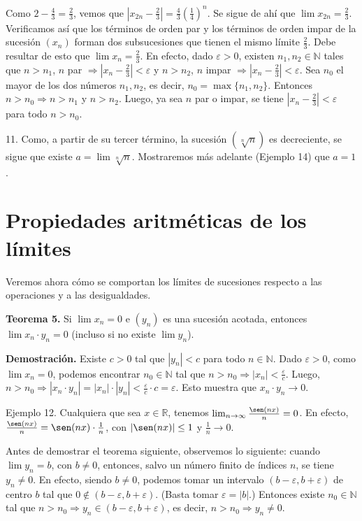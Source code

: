 \documentclass[12pt,oneside]{book}
\begin{document}
Como \(2 - \frac{4}{3} = \frac{2}{3}\), vemos que \(\left|x_{2n} - \frac{2}{3}\right| = \frac{4}{3} \left( \frac{1}{4} \right)^n\). Se sigue de ahí que \(\lim x_{2n} = \frac{2}{3}\). Verificamos así que los términos de orden par y los términos de orden impar de la sucesión \((x_n)\) forman dos subsucesiones que tienen el mismo límite \(\frac{2}{3}\). Debe resultar de esto que \(\lim x_n = \frac{2}{3}\). En efecto, dado \(\varepsilon > 0\), existen \(n_1, n_2 \in \mathbb{N}\) tales que \(n > n_1\), \(n\) par \(\Rightarrow \left|x_n - \frac{2}{3}\right| < \varepsilon\) y \(n > n_2\), \(n\) impar \(\Rightarrow \left|x_n - \frac{2}{3}\right| < \varepsilon\). Sea \(n_0\) el mayor de los dos números \(n_1, n_2\), es decir, \(n_0 = \max\{n_1, n_2\}\). Entonces \(n > n_0 \Rightarrow n > n_1\) y \(n > n_2\). Luego, ya sea \(n\) par o impar, se tiene \(\left|x_n - \frac{2}{3}\right| < \varepsilon\) para todo \(n > n_0\).

11. Como, a partir de su tercer término, la sucesión \((\sqrt[n]{n})\) es decreciente, se sigue que existe \(a = \lim \sqrt[n]{n}\). Mostraremos más adelante (Ejemplo 14) que \(a = 1\).

\section{Propiedades aritméticas de los límites}

Veremos ahora cómo se comportan los límites de sucesiones respecto a las operaciones y a las desigualdades.

\textbf{Teorema 5.} Si \(\lim x_n = 0\) e \((y_n)\) es una sucesión acotada, entonces \(\lim x_n \cdot y_n = 0\) (incluso si no existe \(\lim y_n\)).

\textbf{Demostración.} Existe \(c > 0\) tal que \(|y_n| < c\) para todo \(n \in \mathbb{N}\). Dado \(\varepsilon > 0\), como \(\lim x_n = 0\), podemos encontrar \(n_0 \in \mathbb{N}\) tal que \(n > n_0 \Rightarrow |x_n| < \frac{\varepsilon}{c}\). Luego, \(n > n_0 \Rightarrow |x_n \cdot y_n| = |x_n| \cdot |y_n| < \frac{\varepsilon}{c} \cdot c = \varepsilon\). Esto muestra que \(x_n \cdot y_n \to 0\).

Ejemplo 12. Cualquiera que sea \(x \in \mathbb{R}\), tenemos \(\lim_{n \to \infty} \frac{\sen(nx)}{n} = 0\). En efecto, \(\frac{\sen(nx)}{n} = \sen(nx) \cdot \frac{1}{n}\), con \(|\sen(nx)| \leq 1\) y \(\frac{1}{n} \to 0\).

Antes de demostrar el teorema siguiente, observemos lo siguiente: cuando \(\lim y_n = b\), con \(b \neq 0\), entonces, salvo un número finito de índices \(n\), se tiene \(y_n \neq 0\). En efecto, siendo \(b \neq 0\), podemos tomar un intervalo \((b - \varepsilon, b + \varepsilon)\) de centro \(b\) tal que \(0 \notin (b - \varepsilon, b + \varepsilon)\). (Basta tomar \(\varepsilon = |b|\).) Entonces existe \(n_0 \in \mathbb{N}\) tal que \(n > n_0 \Rightarrow y_n \in (b - \varepsilon, b + \varepsilon)\), es decir, \(n > n_0 \Rightarrow y_n \neq 0\).
\end{document}
